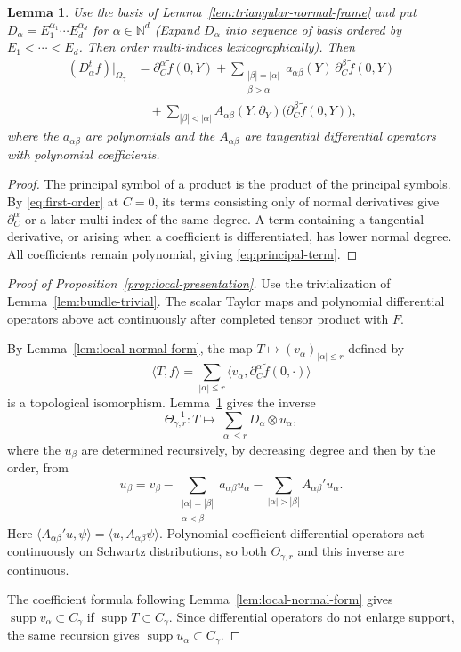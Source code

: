 \documentclass[a4paper,12pt]{amsart}
\numberwithin{equation}{section}
\newtheorem{lemma}[theorem]{Lemma}
\theoremstyle{definition}
\theoremstyle{remark}
\newcommand{\supp}{\operatorname{supp}}
\begin{document}
\begin{lemma}\label{lem:PBW-normal-jets}
Use the basis of Lemma~\ref{lem:triangular-normal-frame} and put $D_\alpha=E_1^{\alpha_1}\cdots E_d^{\alpha_d}$ for $\alpha\in\mathbb N^d$ (Expand $D_\alpha$ into sequence of basis ordered by $E_1<\cdots<E_d$. Then order multi-indices lexicographically). Then
\begin{equation}\label{eq:principal-term}
\begin{aligned}
 (D_\alpha^tf)|_{\Omega_\gamma}
 &=\partial_C^\alpha\widetilde f(0,Y)
 +\sum_{\substack{|\beta|=|\alpha|\\\beta>\alpha}}a_{\alpha\beta}(Y)\,\partial_C^\beta\widetilde f(0,Y)\\
 &\quad+\sum_{|\beta|<|\alpha|}A_{\alpha\beta}(Y,\partial_Y)\bigl(\partial_C^\beta\widetilde f(0,Y)\bigr),
\end{aligned}
\end{equation}
where the $a_{\alpha\beta}$ are polynomials and the $A_{\alpha\beta}$ are tangential differential operators with polynomial coefficients.
\end{lemma}

\begin{proof}
The principal symbol of a product is the product of the principal symbols. By \eqref{eq:first-order} at $C=0$, its terms consisting only of normal derivatives give $\partial_C^\alpha$ or a later multi-index of the same degree. A term containing a tangential derivative, or arising when a coefficient is differentiated, has lower normal degree. All coefficients remain polynomial, giving \eqref{eq:principal-term}.
\end{proof}

\begin{proof}[Proof of Proposition~\ref{prop:local-presentation}]
Use the trivialization of Lemma~\ref{lem:bundle-trivial}. The scalar Taylor maps and polynomial differential operators above act continuously after completed tensor product with $F$.

By Lemma~\ref{lem:local-normal-form}, the map $T\mapsto(v_\alpha)_{|\alpha|\le r}$ defined by
\[
 \langle T,f\rangle=\sum_{|\alpha|\le r}\langle v_\alpha,\partial_C^\alpha\widetilde f(0,\cdot)\rangle
\]
is a topological isomorphism. Lemma~\ref{lem:PBW-normal-jets} gives the inverse
\[
 \Theta_{\gamma,r}^{-1}:T\longmapsto\sum_{|\alpha|\le r}D_\alpha\otimes u_\alpha,
\]
where the $u_\beta$ are determined recursively, by decreasing degree and then by the order, from
\[
 u_\beta=v_\beta
 -\sum_{\substack{|\alpha|=|\beta|\\\alpha<\beta}}a_{\alpha\beta}u_\alpha
 -\sum_{|\alpha|>|\beta|}A_{\alpha\beta}'u_\alpha.
\]
Here $\langle A_{\alpha\beta}'u,\psi\rangle=\langle u,A_{\alpha\beta}\psi\rangle$. Polynomial-coefficient differential operators act continuously on Schwartz distributions, so both $\Theta_{\gamma,r}$ and this inverse are continuous.

The coefficient formula following Lemma~\ref{lem:local-normal-form} gives $\supp v_\alpha\subset C_\gamma$ if $\supp T\subset C_\gamma$. Since differential operators do not enlarge support, the same recursion gives $\supp u_\alpha\subset C_\gamma$.
\end{proof}
\end{document}
